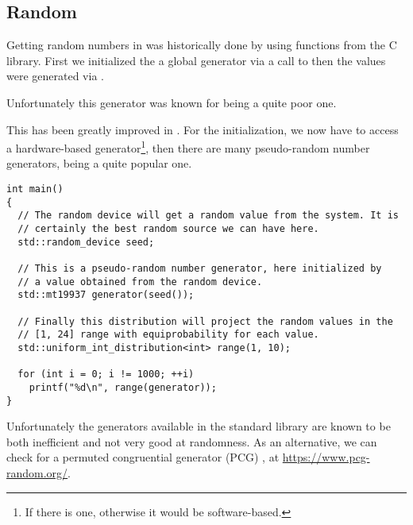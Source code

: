 \subsection{Random}

Getting random numbers in \cpp{} was historically done by using
functions from the C library. First we initialized the a global
generator via a call to  then the values were generated
via .

Unfortunately this generator was known for being a quite poor one.

%
%
This has been greatly improved in . For the initialization, we
now have  to access a hardware-based
generator\footnote{If there is one, otherwise it would be
  software-based.}, then there are many pseudo-random number
generators,  being a quite popular one.

\begin{lstlisting}
int main()
{
  // The random device will get a random value from the system. It is
  // certainly the best random source we can have here.
  std::random_device seed;

  // This is a pseudo-random number generator, here initialized by
  // a value obtained from the random device.
  std::mt19937 generator(seed());

  // Finally this distribution will project the random values in the
  // [1, 24] range with equiprobability for each value.
  std::uniform_int_distribution<int> range(1, 10);

  for (int i = 0; i != 1000; ++i)
    printf("%d\n", range(generator));
}
\end{lstlisting}

Unfortunately the generators available in the standard library are
known to be both inefficient and not very good at randomness. As an
alternative, we can check for a permuted congruential generator (PCG)
\cite{pcg}, at \url{https://www.pcg-random.org/}.
